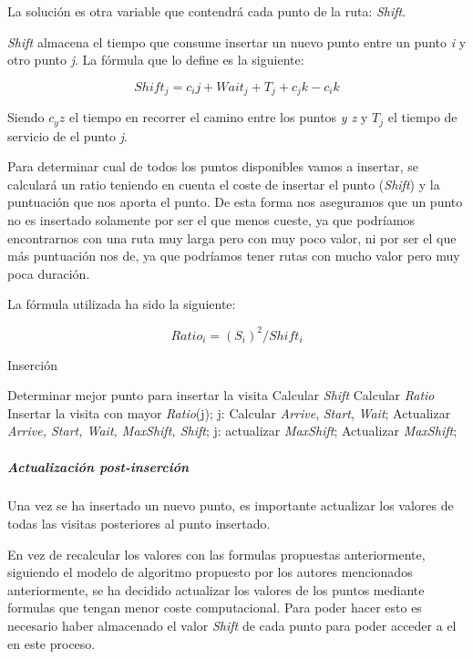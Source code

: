 La solución es otra variable que contendrá cada punto de la ruta: \textit{Shift}.

\textit{Shift} almacena el tiempo que consume insertar un nuevo punto entre un punto \textit{i} y otro punto \textit{j}.
La fórmula que lo define es la siguiente:

\[Shift_j = c_ij + Wait_j + T_j + c_jk - c_ik\]

Siendo $c_yz$ el tiempo en recorrer el camino entre los puntos \textit{y z} y $T_j$ el tiempo de servicio de el punto \textit{j}.

Para determinar cual de todos los puntos disponibles vamos a insertar, se calculará un ratio teniendo en cuenta el coste de insertar el punto (\textit{Shift}) y la puntuación que nos aporta el punto. De esta forma nos aseguramos que un punto no es insertado solamente por ser el que menos cueste, ya que podríamos encontrarnos con una ruta muy larga pero con muy poco valor, ni por ser el que más puntuación nos de, ya que podríamos tener rutas con mucho valor pero muy poca duración.

La fórmula utilizada ha sido la siguiente:

\[Ratio_i = (S_i)^2/Shift_i\]

\begin{algorithm}
\caption{Inserción}
\begin{algorithmic}
\STATE Determinar mejor punto para insertar la visita
\STATE Calcular \textit{Shift}
\STATE Calcular \textit{Ratio}
\ENDFOR
\STATE Insertar la visita con mayor \textit{Ratio}(j);
\STATE j: Calcular \textit{Arrive}, \textit{Start}, \textit{Wait};
\STATE Actualizar \textit{Arrive, Start, Wait, MaxShift, Shift};
\ENDFOR
\STATE j: actualizar \textit{MaxShift};
\STATE Actualizar \textit{MaxShift};
\ENDFOR 
\end{algorithmic}
\end{algorithm}

\subparagraph{Actualización post-inserción}
\break
Una vez se ha insertado un nuevo punto, es importante actualizar los valores de todas las visitas posteriores al punto insertado.

En vez de recalcular los valores con las formulas propuestas anteriormente, siguiendo el modelo de algoritmo propuesto por los autores mencionados anteriormente, se ha decidido actualizar los valores de los puntos mediante formulas que tengan menor coste computacional. Para poder hacer esto es necesario haber almacenado el valor \textit{Shift} de cada punto para poder acceder a el en este proceso.

